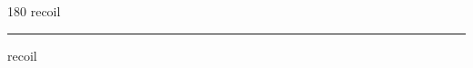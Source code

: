
\begin{frame}
\begin{center}
\begin{turn}{180}
{\fontsize{2.5cm}{1em}\selectfont recoil}
\end{turn}
\vspace{1em}\par  
\hrule
\vspace{1em}\par  
{\fontsize{2.5cm}{1em}\selectfont recoil}
\end{center}
\end{frame}
